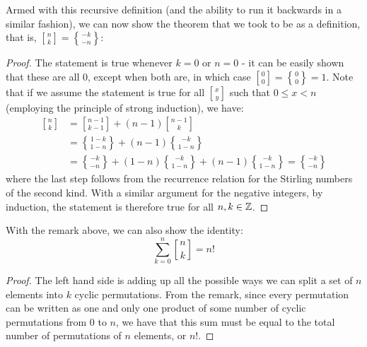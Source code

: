 \documentclass[11pt,twosided]{article}
\newcommand{\stirlingone}[2]{\genfrac[]{0pt}{1}{#1}{#2}}
\newcommand{\stiri}[2]{\stirlingone{#1}{#2}}
\newcommand{\dstirlingone}[2]{\genfrac[]{0pt}{0}{#1}{#2}}
\newcommand{\dstiri}[2]{\dstirlingone{#1}{#2}}
\newcommand{\stirlingtwo}[2]{\genfrac\{\}{0pt}{1}{#1}{#2}}
\newcommand{\stirii}[2]{\stirlingtwo{#1}{#2}}
\newcommand{\dstirlingtwo}[2]{\genfrac\{\}{0pt}{0}{#1}{#2}}
\newcommand{\dstirii}[2]{\dstirlingtwo{#1}{#2}}
\begin{document}
Armed with this recursive definition (and the ability to run it backwards in a similar fashion), we can now show the theorem that we took to be as a definition, that is, $\stiri{n}{k} = \stirii{-k}{-n}$: 
\begin{proof}
The statement is true whenever $k = 0$ or $n = 0$ - it can be easily shown that these are all $0$, except when both are, in which case $\stiri{0}{0} = \stirii{0}{0} = 1$. Note that if we assume the statement is true for all $\stiri{x}{y}$ such that $0 \leq x < n$ (employing the principle of strong induction), we have:
\begin{align*}
\dstiri{n}{k} &= \dstiri{n-1}{k-1} + (n-1) \dstiri{n-1}{k} \\
&= \dstirii{1-k}{1-n} + (n-1) \dstirii{-k}{1-n} \\
&= \dstirii{-k}{-n} + (1-n) \dstirii{-k}{1-n} + (n-1) \dstirii{-k}{1-n} = \dstirii{-k}{-n}
\end{align*}
where the last step follows from the recurrence relation for the Stirling numbers of the second kind. With a similar argument for the negative integers, by induction, the statement is therefore true for all $n, k \in \mathbb{Z}$. 
\end{proof} 

With the remark above, we can also show the identity: 
\[
	\sum_{k=0}^n \dstiri{n}{k} = n! 
\]	

\begin{proof}
	The left hand side is adding up all the possible ways we can split a set of $n$ elements into $k$ cyclic permutations. From the remark, since every permutation can be written as one and only one product of some number of cyclic permutations from $0$ to $n$, we have that this sum must be equal to the total number of permutations of $n$ elements, or $n!$. 
\end{proof}
\end{document}
